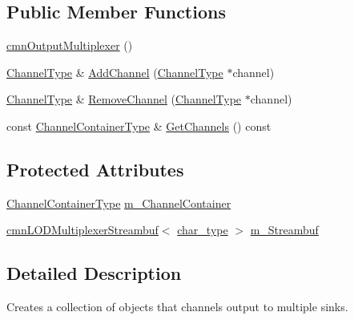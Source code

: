 \subsection*{Public Member Functions}
\begin{DoxyCompactItemize}
\item 
\hyperlink{classcmn_output_multiplexer_ae508d920a59799588a6bcd87a5e33f50}{cmn\+Output\+Multiplexer} ()
\item 
\hyperlink{classcmn_output_multiplexer_abebdbc4cebf9eeb2ce4159f2c649968e}{Channel\+Type} \& \hyperlink{classcmn_output_multiplexer_a70d534895f21217e1e7e75e837fc65e7}{Add\+Channel} (\hyperlink{classcmn_output_multiplexer_abebdbc4cebf9eeb2ce4159f2c649968e}{Channel\+Type} $\ast$channel)
\item 
\hyperlink{classcmn_output_multiplexer_abebdbc4cebf9eeb2ce4159f2c649968e}{Channel\+Type} \& \hyperlink{classcmn_output_multiplexer_acd5d9cf95e534975f63dc4a61bd54b84}{Remove\+Channel} (\hyperlink{classcmn_output_multiplexer_abebdbc4cebf9eeb2ce4159f2c649968e}{Channel\+Type} $\ast$channel)
\item 
const \hyperlink{classcmn_output_multiplexer_aca2d6dc567cf721a0dbb2f887c175b7b}{Channel\+Container\+Type} \& \hyperlink{classcmn_output_multiplexer_a9720bcf8e2380b30373fbd1ad329f639}{Get\+Channels} () const 
\end{DoxyCompactItemize}
\subsection*{Protected Attributes}
\begin{DoxyCompactItemize}
\item 
\hyperlink{classcmn_output_multiplexer_aca2d6dc567cf721a0dbb2f887c175b7b}{Channel\+Container\+Type} \hyperlink{classcmn_output_multiplexer_a2bbdcfbb9a7395c5538432523ade4b1a}{m\+\_\+\+Channel\+Container}
\item 
\hyperlink{classcmn_l_o_d_multiplexer_streambuf}{cmn\+L\+O\+D\+Multiplexer\+Streambuf}$<$ \hyperlink{classcmn_output_multiplexer_aa35542dd7f4e6d55780bc7ed741910fe}{char\+\_\+type} $>$ \hyperlink{classcmn_output_multiplexer_a64c336dbeee16f5d94503c2a4265b97c}{m\+\_\+\+Streambuf}
\end{DoxyCompactItemize}


\subsection{Detailed Description}
Creates a collection of objects that channels output to multiple sinks. 

